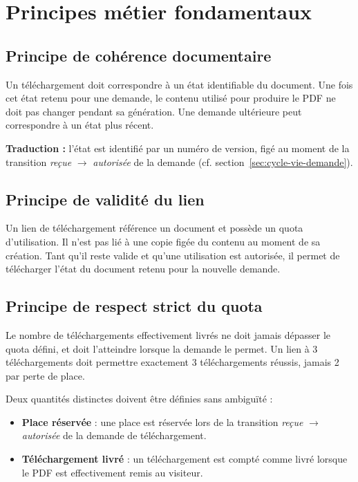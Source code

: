 \chapter{Principes métier fondamentaux}

\section{Principe de cohérence documentaire}
\begin{principebox}
Un téléchargement doit correspondre à un état identifiable du document. Une fois cet état retenu pour une demande, le contenu utilisé pour produire le PDF ne doit pas changer pendant sa génération. Une demande ultérieure peut correspondre à un état plus récent.

\smallskip
\textbf{Traduction :} l'état est identifié par un numéro de version, figé au moment de la transition \emph{reçue} $\to$ \emph{autorisée} de la demande (cf. section~\ref{sec:cycle-vie-demande}).
\end{principebox}

\section{Principe de validité du lien}
\begin{principebox}
Un lien de téléchargement référence un document et possède un quota d'utilisation. Il n'est pas lié à une copie figée du contenu au moment de sa création. Tant qu'il reste valide et qu'une utilisation est autorisée, il permet de télécharger l'état du document retenu pour la nouvelle demande.
\end{principebox}

\section{Principe de respect strict du quota}

\begin{criticalbox}
Le nombre de téléchargements effectivement livrés ne doit jamais dépasser le quota défini, et doit l'atteindre lorsque la demande le permet. Un lien à 3 téléchargements doit permettre exactement 3 téléchargements réussis, jamais 2 par perte de place.
\end{criticalbox}

Deux quantités distinctes doivent être définies sans ambiguïté :
\begin{itemize}
    \item \textbf{Place réservée} : une place est réservée lors de la transition \emph{reçue} $\to$ \emph{autorisée} de la demande de téléchargement.
    \item \textbf{Téléchargement livré} : un téléchargement est compté comme livré lorsque le PDF est effectivement remis au visiteur.
\end{itemize}

